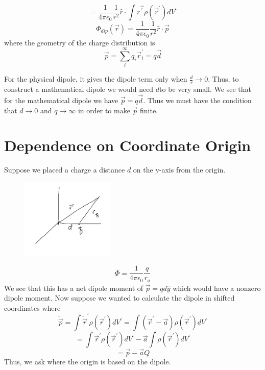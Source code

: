 \[
    =\frac{1}{4\pi \epsilon _0} \frac{1}{r^{2} } \hat{r} \cdot \int r^{\vec{\prime}} \rho(\vec{r} ^{\prime} ) dV^{\prime} 
\]
\[
    \Phi_{dip} (\vec{r}) = \frac{1}{4\pi \epsilon _0}\frac{1}{r^{2} } \hat{r}  \cdot \vec{p} 
\]
where the geometry of the charge distribution is  
\[
     \vec{p} = \sum_{i}^{\infty}q_i \vec{r}_i^{\prime} = q \vec{d} 
\]
\begin{remark}
    For the physical dipole, it gives the dipole term only when \(\frac{d}{r} \to 0\). Thus, to construct a mathematical dipole we would need \(d\)to be very small. We see that for the mathematical dipole we have \(\vec{p}  = q \vec{d} \). 
Thus we must have the condition that \(d \to  0\) and \(q \to  \infty \) in order to make \(\vec{p} \) finite.       
\end{remark}
\section{Dependence on Coordinate Origin}
Suppose we placed a charge a distance \(d\) on the y-axis from the origin. 
\begin{figure}[H]
    \centering
    \includegraphics[width=0.4\textwidth]{Figures/08.png}
    \caption{}
    \label{fig:}
\end{figure} 
\[
    \Phi  = \frac{1}{4\pi \epsilon _0} \frac{q}{r_q}
\]
We see that this has a net dipole moment of \( \vec{p}  = q d \hat{y} \) which would have a nonzero dipole moment. Now suppose we wanted to calculate the dipole in shifted coordinates where 
\[
    \widetilde{\vec{p} } = \int  \widetilde{\vec{r} }^{\prime}  \rho(\vec{r} ^{\prime} ) dV^{\prime}  = 
    \int  \left(  \vec{r} ^{\prime} - \vec{a}  \right) \rho (\vec{r} ^{\prime} ) dV^{\prime}   
\]
\[
    = \int  \vec{r} ^{\prime} \rho (\vec{r} ^{\prime} ) dV^{\prime}  - \vec{a} \int  \rho(\vec{r} ^{\prime} ) dV^{\prime} 
\]
\[
    = \vec{p}  - \vec{a}  Q
\]
Thus, we ask where the origin is based on the dipole. 
